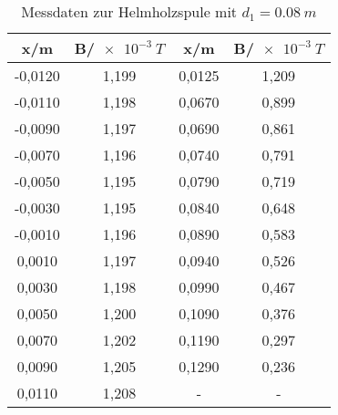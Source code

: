 

\begin{table}[h!]
  \centering
  \caption{Messdaten zur Helmholzspule mit $d_{1}=\SI{0.08}{m}$}
  \label{tab:h8}
  \begin{tabular}{c c c c}
    \toprule
     x/m &	 B/$\SI{e-3}{T}$ & x/m &	 B/$\SI{e-3}{T}$   \\
    \midrule
    -0,0120	& 1,199 &   0,0125	& 1,209\\
    -0,0110	& 1,198 &   0,0670 & 0,899\\
    -0,0090	& 1,197 &   0,0690 & 0,861\\
    -0,0070	& 1,196 &   0,0740 & 0,791\\
    -0,0050	& 1,195 &   0,0790 & 0,719\\
    -0,0030	& 1,195 &   0,0840 & 0,648\\
    -0,0010	& 1,196 &   0,0890 & 0,583\\
     0,0010	& 1,197 &   0,0940 & 0,526\\
     0,0030	& 1,198 &   0,0990 & 0,467\\
     0,0050	& 1,200 &   0,1090 & 0,376\\
     0,0070	& 1,202 &   0,1190 & 0,297\\
     0,0090	& 1,205 &   0,1290 & 0,236\\
     0,0110	& 1,208 &   - & - \\


    \bottomrule
  \end{tabular}
\end{table}
